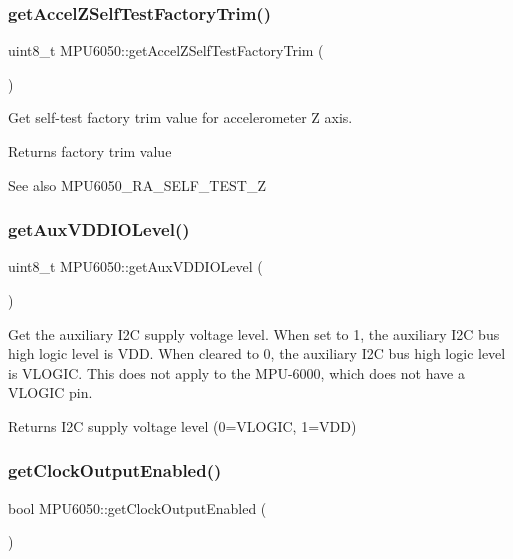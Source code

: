 \subsubsection{\texorpdfstring{getAccelZSelfTestFactoryTrim()}{getAccelZSelfTestFactoryTrim()}}
{\footnotesize\ttfamily uint8\+\_\+t M\+P\+U6050\+::get\+Accel\+Z\+Self\+Test\+Factory\+Trim (\begin{DoxyParamCaption}{ }\end{DoxyParamCaption})}

Get self-\/test factory trim value for accelerometer Z axis. \begin{DoxyReturn}{Returns}
factory trim value 
\end{DoxyReturn}
\begin{DoxySeeAlso}{See also}
M\+P\+U6050\+\_\+\+R\+A\+\_\+\+S\+E\+L\+F\+\_\+\+T\+E\+S\+T\+\_\+Z 
\end{DoxySeeAlso}
\mbox{\label{class_m_p_u6050_af6e9af8e2222889fd5458e2ae12c55c8}} 
\subsubsection{\texorpdfstring{getAuxVDDIOLevel()}{getAuxVDDIOLevel()}}
{\footnotesize\ttfamily uint8\+\_\+t M\+P\+U6050\+::get\+Aux\+V\+D\+D\+I\+O\+Level (\begin{DoxyParamCaption}{ }\end{DoxyParamCaption})}

Get the auxiliary I2C supply voltage level. When set to 1, the auxiliary I2C bus high logic level is V\+DD. When cleared to 0, the auxiliary I2C bus high logic level is V\+L\+O\+G\+IC. This does not apply to the M\+P\+U-\/6000, which does not have a V\+L\+O\+G\+IC pin. \begin{DoxyReturn}{Returns}
I2C supply voltage level (0=V\+L\+O\+G\+IC, 1=V\+DD) 
\end{DoxyReturn}
\mbox{\label{class_m_p_u6050_ada96c33957bf20c04ca598a3537358ef}} 
\subsubsection{\texorpdfstring{getClockOutputEnabled()}{getClockOutputEnabled()}}
{\footnotesize\ttfamily bool M\+P\+U6050\+::get\+Clock\+Output\+Enabled (\begin{DoxyParamCaption}{ }\end{DoxyParamCaption})}

